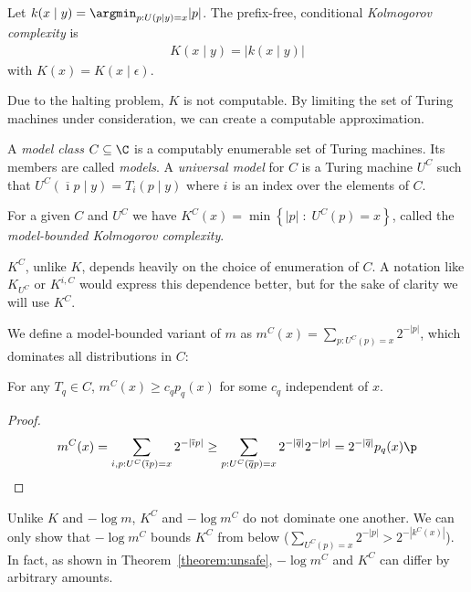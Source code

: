 \begin{definition}
Let $k(x\mid y) = \argmin_{p:U(p\mid y) = x} |p|$. The prefix-free, conditional \emph{Kolmogorov complexity} is \begin{align*}
K(x\mid y) = |k(x\mid y)|
\end{align*} with $K(x) = K(x\mid \epsilon)$. \label{definition:kolmogorov-complexity}
\end{definition}
Due to the halting problem, $K$ is not computable. By limiting the set of Turing machines under consideration, we can create a computable approximation. 

\begin{definition}
A \emph{model class} $C \subseteq \C$ is a computably enumerable set of Turing machines. Its members are called \emph{models}. A \emph{universal model} for $C$ is a Turing machine $U^C$ such that $U^C(\overline{\imath}p\mid y) = T_i(p\mid y)$ where $i$ is an index over the elements of $C$. 
\end{definition}

\begin{definition}
For a given $C$ and $U^C$ we have $K^C(x) = \min \left \{|p| \;:\; U^C(p) = x \right \}$, called the \emph{model-bounded Kolmogorov complexity}.
\end{definition}
$K^C$, unlike $K$, depends heavily on the choice of enumeration of $C$. A notation like $K_{U^C}$ or $K^{i, C}$ would express this dependence better, but for the sake of clarity we will use $K^C$.

We define a model-bounded variant of $m$ as $m^C(x) = \sum_{p: U^C(p) = x} 2^{-|p|}$, which dominates all distributions in $C$:

\begin{lemma}
For any $T_q \in C$, $m^C(x) \geq c_q p_q(x)$ for some $c_q$ independent of $x$.
\label{lemma:universal-bounded-distribution}
\end{lemma}
\begin{proof}\belowdisplayskip=-12pt
\begin{align*}
m^C(x) = \sum_{i,p : U^C(\overline{\imath}p) = x} 2^{-|\overline{\imath}p|} 
\geq \sum_{p : U^C(\overline{q}p) = x} 2^{-|\overline{q}|}2^{-|p|} 
= 2^{-|\overline{q}|} p_q(x) \p
\end{align*}
\end{proof}

\noindent Unlike $K$ and $-\log m$, $K^C$ and $-\log m^C$ do not dominate one another. We can only show that $-\log m^C$ bounds $K^C$ from below ($\sum_{U^C(p)=x} 2^{-|p|} > 2^{-|k^C(x)|}$). In fact, as shown in Theorem~\ref{theorem:unsafe}, $-\log m^C$ and $K^C$ can differ by arbitrary amounts.

